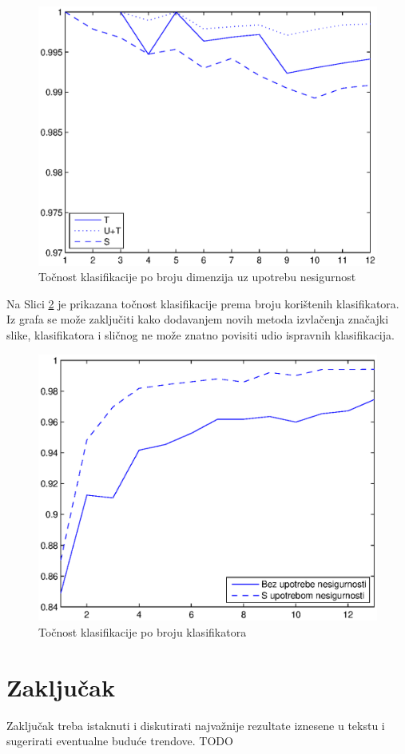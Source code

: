\documentclass[a4paper,twocolumn,dvipdfm]{article}
\begin{document}
\begin{figure}
\centering
\includegraphics[scale=0.5]{accByDim2.eps}
\caption{Točnost klasifikacije po broju dimenzija uz upotrebu nesigurnost}
\label{figure:rezPoDim2}
\end{figure}

Na Slici \ref{figure:rezPoBrojuKlas} je prikazana točnost klasifikacije prema
broju korištenih klasifikatora. Iz grafa se može zaključiti kako dodavanjem
novih metoda izvlačenja značajki slike, klasifikatora i sličnog ne može znatno
povisiti udio ispravnih klasifikacija.

\begin{figure}
\centering
\includegraphics[scale=0.5]{accByClassifCount.eps}
\caption{Točnost klasifikacije po broju klasifikatora}
\label{figure:rezPoBrojuKlas}
\end{figure}


\section{Zaključak}
Zaključak treba istaknuti i diskutirati najvažnije rezultate iznesene u tekstu
i sugerirati eventualne buduće trendove. TODO



\end{document}
